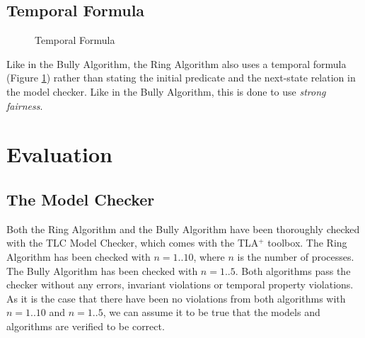 \documentclass{report}
\begin{document}
\section{Temporal Formula}

\begin{figure}
  \tlatex
\@x{}\moduleLeftDash{}\moduleRightDash\@xx{}%
\@x{}\bottombar\@xx{}%
  \caption{Temporal Formula}
  \label{ringtemporalformula}
  \end{figure}

Like in the Bully Algorithm, the Ring Algorithm also uses a temporal formula (Figure \ref{ringtemporalformula}) rather than stating the initial predicate and the next-state relation in the model checker. Like in the Bully Algorithm, this is done to use \textit{strong fairness}.

\chapter{Evaluation}
\section{The Model Checker}
Both the Ring Algorithm and the Bully Algorithm have been thoroughly checked with the TLC Model Checker, which comes with the TLA$^{+}$ toolbox. The Ring Algorithm has been checked with $n = 1..10$, where $n$ is the number of processes. The Bully Algorithm has been checked with $n = 1..5$. Both algorithms pass the checker without any errors, invariant violations or temporal property violations. As it is the case that there have been no violations from both algorithms with $n = 1..10$ and $n = 1..5$, we can assume it to be true that the models and algorithms are verified to be correct.
\end{document}

